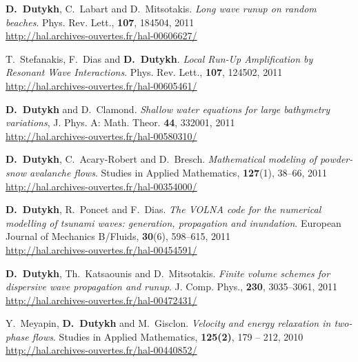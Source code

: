 \begin{etaremune}
  \item \textbf{D.~Dutykh}, C.~Labart and D.~Mitsotakis. \textit{Long wave runup on random beaches}. Phys. Rev. Lett., \textbf{107}, 184504, 2011 \\ %
  \url{http://hal.archives-ouvertes.fr/hal-00606627/}
  
  \item T.~Stefanakis, F.~Dias and \textbf{D.~Dutykh}. \textit{Local Run-Up Amplification by Resonant Wave Interactions}. Phys. Rev. Lett., \textbf{107}, 124502, 2011 \\ %
  \url{http://hal.archives-ouvertes.fr/hal-00605461/}
  
  \item \textbf{D.~Dutykh} and D.~Clamond. \textit{Shallow water equations for large bathymetry variations}, J. Phys. A: Math. Theor. \textbf{44}, 332001, 2011 \\ %
  \url{http://hal.archives-ouvertes.fr/hal-00580310/}
      
  \item \textbf{D.~Dutykh}, C.~Acary-Robert and D.~Bresch. \textit{Mathematical modeling of powder-snow avalanche flows}. Studies in Applied Mathematics, \textbf{127}(1), 38--66, 2011 \\ %
  \url{http://hal.archives-ouvertes.fr/hal-00354000/}

  \item \textbf{D.~Dutykh}, R.~Poncet and F.~Dias. \textit{The VOLNA code for the numerical modelling of tsunami waves: generation, propagation and inundation}. European Journal of Mechanics B/Fluids, \textbf{30}(6), 598--615, 2011 \\ %
  \url{http://hal.archives-ouvertes.fr/hal-00454591/}
    
  \item \textbf{D.~Dutykh}, Th.~Katsaounis and D.~Mitsotakis. \textit{Finite volume schemes for dispersive wave propagation and runup}. J. Comp. Phys., \textbf{230}, 3035--3061, 2011 \\ %
  \url{http://hal.archives-ouvertes.fr/hal-00472431/}
  
  
  \item Y.~Meyapin, \textbf{D.~Dutykh} and M.~Gisclon. \textit{Velocity and energy relaxation in two-phase flows}. Studies in Applied Mathematics, \textbf{125(2)}, 179 -- 212, 2010 \\ %
  \url{http://hal.archives-ouvertes.fr/hal-00440852/}


\end{etaremune}
